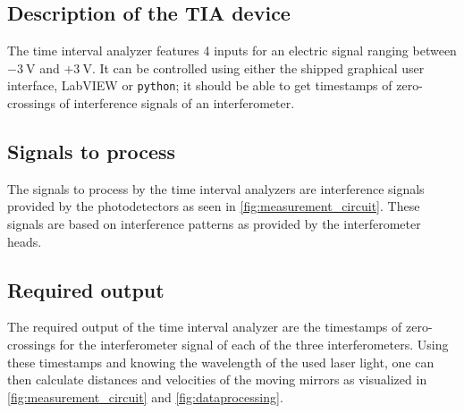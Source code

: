 \documentclass{report}
\numberwithin{tm}{section}
\begin{document}
\subsection{Description of the TIA device}
The time interval analyzer features 4 inputs for an electric signal ranging between $-\SI{3}{\volt}$ and $+\SI{3}{\volt}$. It can be controlled using either the shipped graphical user interface, LabVIEW or \verb|python|; it should be able to get timestamps of zero-crossings of interference signals of an interferometer.

\subsection{Signals to process}
The signals to process by the time interval analyzers are interference signals provided by the photodetectors as seen in \cref{fig:measurement_circuit}. These signals are based on interference patterns as provided by the interferometer heads.

\subsection{Required output}
The required output of the time interval analyzer are the timestamps of zero-crossings for the interferometer signal of each of the three interferometers. Using these timestamps and knowing the wavelength of the used laser light, one can then calculate distances and velocities of the moving mirrors as visualized in \cref{fig:measurement_circuit} and \cref{fig:dataprocessing}.
\end{document}
